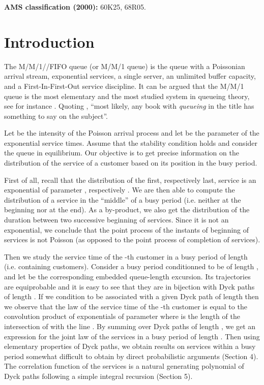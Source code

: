 \documentclass[11pt,a4paper]{article}
\numberwithin{equation}{section}
\newcommand{\1}{\mathbbm{1}}
\begin{document}
{\noindent\bf AMS classification (2000):} 60K25, 68R05.




\section{Introduction}

The M/M/1//FIFO queue (or M/M/1 queue) is the queue with a
Poissonian arrival stream, exponential services, a single server,
an unlimited buffer capacity, and a First-In-First-Out service
discipline. It can be argued that the M/M/1 queue is
the most elementary and the most studied system in queueing theory,
see for instance \cite{cohe82,taka,robe,ScWe}. Quoting \cite{ScWe},
``most likely, any book with {\em queueing} in the title has something
to say on the subject''.

Let  be the intensity of the Poisson arrival process and let
 be the parameter of the exponential service times. Assume that
the stability condition  holds and consider the queue
in equilibrium. Our objective is to get precise information on the
distribution of the service of a customer based on its position  in
the busy period.


First of all, recall that the distribution of the first, respectively
last,  service is an
exponential of parameter , respectively .
We are then able
to compute the distribution of a service in the ``middle''
of a busy period (i.e. neither at the beginning nor at the end).
As a by-product, we also get the distribution of the duration between
two successive beginning of services. Since it is not an exponential,
we conclude that the point process of
the instants of beginning of services is not Poisson (as opposed to the point process
of completion of services).

Then we study the service time of the -th customer in a busy period of length 
(i.e. containing  customers). Consider a busy period conditionned to be of length ,
and let  be the corresponding embedded queue-length excursion.
Its trajectories are equiprobable and it is easy to see that they are in bijection with Dyck paths of length .
If we condition  to be associated with a given Dyck path  of length  then we observe
that the law of the service time of the -th customer is equal to the convolution product of  exponentials
of parameter  where  is the length of the intersection of  with the line .
By summing over Dyck paths of length , we get an expression for the joint law of the services in a busy period of length .
Then using elementary properties of Dyck paths, we obtain results on services within a busy period somewhat difficult to obtain
by direct probabilistic arguments (Section 4). The correlation function of the services is a natural generating polynomial of
Dyck paths following a simple integral recursion (Section 5).
\end{document}
